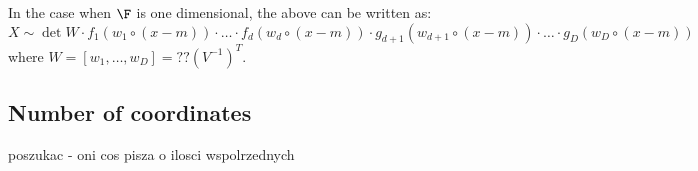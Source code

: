 In the case when $\F$ is one dimensional, the above can be written as:
$$
X \sim \det W \cdot f_1(w_1 \circ (x-m)) \cdot \ldots \cdot f_d(w_d \circ (x-m))
\cdot g_{d+1}(w_{d+1} \circ (x-m)) \cdot \ldots \cdot g_D(w_D \circ (x-m))
$$
where $W=[w_1,\ldots,w_D]=??(V^{-1})^T$.

\subsection{Number of coordinates}

poszukac - oni cos pisza o ilosci wspolrzednych


